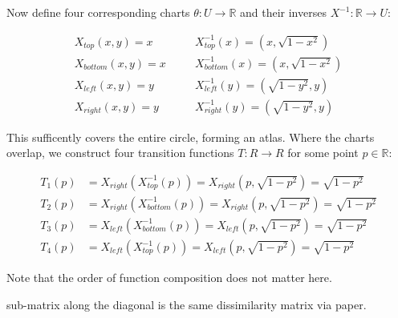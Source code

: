 \documentclass{article}
\begin{document}
        Now define four corresponding charts $\theta: U \rightarrow \mathbb{R}$ and their inverses $X^{-1}: \mathbb{R}\rightarrow U$:

        \begin{align*}
            X_{top}(x,y) = x & \quad & X_{top}^{-1}(x) = (x, \sqrt{1 - x^2}) \\
            X_{bottom}(x,y) = x & \quad & X_{bottom}^{-1}(x) = (x, \sqrt{1 - x^2}) \\
            X_{left}(x,y) = y & \quad & X_{left}^{-1}(y) = (\sqrt{1 - y^2}, y) \\
            X_{right}(x,y) = y & \quad & X_{right}^{-1}(y) = (\sqrt{1 - y^2}, y)
        \end{align*}

        This sufficently covers the entire circle, forming an atlas. Where the charts overlap, we construct four transition functions $T: R \rightarrow R$ for some point $p \in \mathbb{R}$:

        \begin{align*}
            T_1(p) &= X_{right} (X_{top}^{-1}(p)) = X_{right} (p, \sqrt{1 - p^2}) =  \sqrt{1 - p^2} \\
            T_2(p) &= X_{right} (X_{bottom}^{-1}(p)) = X_{right} (p, \sqrt{1 - p^2}) =  \sqrt{1 - p^2} \\
            T_3(p) &= X_{left} (X_{bottom}^{-1}(p)) = X_{left}(p, \sqrt{1 - p^2}) = \sqrt{1 - p^2} \\
            T_4(p) &= X_{left} (X_{top}^{-1}(p)) = X_{left}(p, \sqrt{1 - p^2}) = \sqrt{1 - p^2}
        \end{align*}

        Note that the order of function composition does not matter here.


sub-matrix along the diagonal is the same dissimilarity matrix via paper. 
\end{document}
